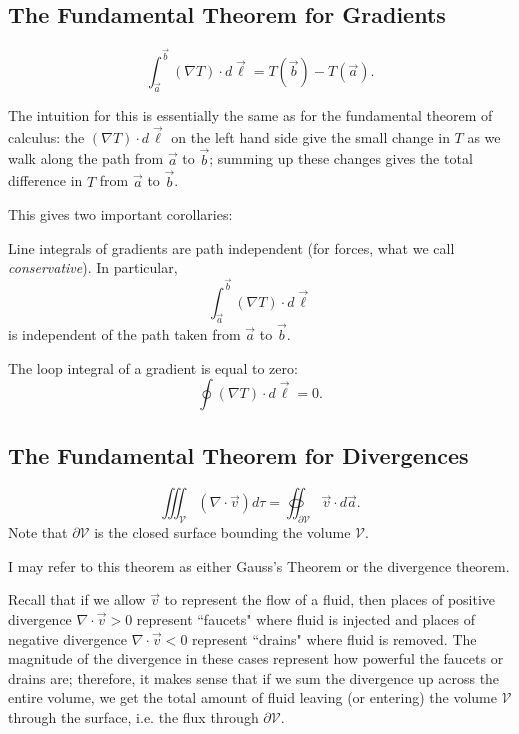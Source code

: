 \subsection{The Fundamental Theorem for Gradients}

\begin{theorem}
\[\int_{\vec{a}}^{\vec{b}}(\nabla T)\cdot d\vec{\ell}=T(\vec{b})-T(\vec{a}).\]
\end{theorem}

The intuition for this is essentially the same as for the fundamental theorem of calculus: the $(\nabla T)\cdot d\vec{\ell}$ on the left hand side give the small change in $T$ as we walk along the path from $\vec{a}$ to $\vec{b}$; summing up these changes gives the total difference in $T$ from $\vec{a}$ to $\vec{b}$.

This gives two important corollaries:

\begin{corollary}
    Line integrals of gradients are path independent (for forces, what we call \textit{conservative}). In particular,
    \[\int_{\vec{a}}^{\vec{b}}(\nabla T)\cdot d\vec{\ell}\]
    is independent of the path taken from $\vec{a}$ to $\vec{b}$.
\end{corollary}

\begin{corollary}
    The loop integral of a gradient is equal to zero:
    \[\oint (\nabla T)\cdot d\vec{\ell}=0.\]
\end{corollary}

\subsection{The Fundamental Theorem for Divergences}

\begin{theorem}
    \[\iiint_{\mathcal{V}}(\nabla\cdot \vec{v})d\tau=\oiint_{\partial\mathcal{V}}\vec{v}\cdot d\vec{a}.\]
    Note that $\partial\mathcal{V}$ is the closed surface bounding the volume $\mathcal{V}$.
\end{theorem}

I may refer to this theorem as either Gauss's Theorem or the divergence theorem.

Recall that if we allow $\vec{v}$ to represent the flow of a fluid, then places of positive divergence $\nabla\cdot\vec{v}>0$ represent ``faucets" where fluid is injected and places of negative divergence $\nabla\cdot\vec{v}<0$ represent ``drains" where fluid is removed. The magnitude of the divergence in these cases represent how powerful the faucets or drains are; therefore, it makes sense that if we sum the divergence up across the entire volume, we get the total amount of fluid leaving (or entering) the volume $\mathcal{V}$ through the surface, i.e. the flux through $\partial \mathcal{V}$.

